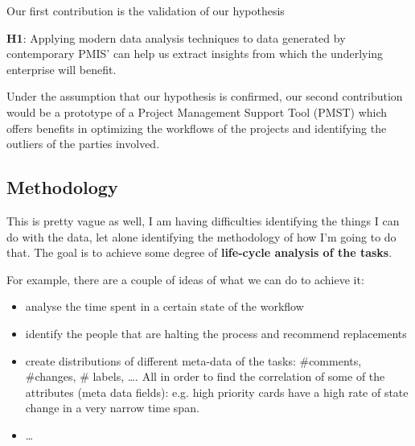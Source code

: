 \documentclass[a4paper, 12pt]{article}
\begin{document}
Our first contribution is the validation of our hypothesis 

\textbf{H1}: Applying modern data analysis techniques to data generated by contemporary PMIS' can help us extract insights from which the underlying enterprise will benefit. 

Under the assumption that our hypothesis is confirmed, our second contribution would be a prototype of a Project Management Support Tool (PMST) which offers benefits in optimizing the workflows of the projects and identifying the outliers of the parties involved.

\subsection{Methodology}


This is pretty vague as well, I am having difficulties identifying the things I can do with the data, let alone identifying the methodology of how I'm going to do that. The goal is to achieve some degree of \textbf{life-cycle analysis of the tasks}.

For example, there are a couple of ideas of what we can do to achieve it:

\begin{itemize}
	\item analyse the time spent in a certain state of the workflow
	
	\item identify the people that are halting the process and recommend replacements

	\item create distributions of different meta-data of the tasks: \#comments, \#changes, \# labels, \dots. All in order to find the correlation of some of the attributes (meta data fields): e.g. high priority cards have a high rate of state change in a very narrow time span.
	
	\item \dots
\end{itemize}
\end{document}
